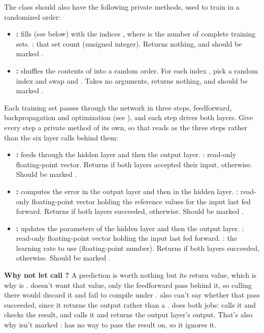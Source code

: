 The class should also have the following private methods, used to train in a randomized order:
\begin{itemize}
  \item \textbf{:} fills  (see below) with the
    indices , where  is the number of complete training sets.
    : that set count (unsigned integer). Returns nothing, and should be marked
    .
  \item \textbf{:} shuffles the contents of  into a
    random order. For each index , pick a random index  and swap
     and . Takes no arguments, returns nothing, and
    should be marked .
\end{itemize}
Each training set passes through the network in three steps, feedforward, backpropagation and
optimization (see ), and each step drives both layers. Give every step a
private method of its own, so that  reads as the three steps rather than the six
layer calls behind them:
\begin{itemize}
  \item \textbf{:} feeds  through the hidden layer and then the
    output layer. : read-only floating-point vector. Returns  if both layers
    accepted their input,  otherwise. Should be marked .
  \item \textbf{:} computes the error in the output layer and then in
    the hidden layer. : read-only floating-point vector holding the reference values
    for the input last fed forward. Returns  if both layers succeeded, 
    otherwise. Should be marked .
  \item \textbf{:} updates the parameters of the hidden layer
    and then the output layer. : read-only floating-point vector holding the input last
    fed forward. : the learning rate to use (floating-point number). Returns
     if both layers succeeded,  otherwise. Should be marked .
\end{itemize}
\textbf{Why not let  call ?} A prediction is worth nothing but its
return value, which is why  is \code{[[nodiscard]]}.  doesn't want
that value, only the feedforward pass behind it, so calling  there would discard it
and fail to compile under .  also can't say whether that pass
succeeded, since it returns the output rather than a .  does both
jobs:  calls it and checks the result, and  calls it and returns the
output layer's output. That's also why  isn't marked \code{[[nodiscard]]}:
 has no way to pass the result on, so it ignores it.

